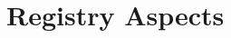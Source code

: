 \documentclass[11pt,a4paper]{ivoa}
\begin{document}
%
%
%
%

\section{Registry Aspects}
\label{sec:registry}
\end{document}
